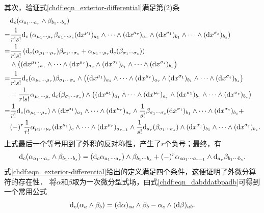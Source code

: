 其次，验证式\eqref{chdf:eqn_exterior-differential}满足第(2)条
\begin{align*}
    & {\rm d}_{c}(\alpha_{a_1\cdots a_r} \wedge \beta_{b_1\cdots b_s}) \\
   =& \frac{1}{r! s!} {\rm d}_{c}\left(\alpha_{\mu_{1}\cdots \mu_{r}} \beta_{\sigma_1\cdots \sigma_s}
      ({\rm d}x^{\mu_1})_{a_{1}} \wedge\cdots\wedge ({\rm d}x^{\mu_r})_{a_{r}}  \wedge
      ({\rm d}x^{\sigma_1})_{b_{1}} \wedge\cdots\wedge ({\rm d}x^{\sigma_s})_{b_{s}}  \right) \\
   =& \frac{1}{r! s!} \left( {\rm d}_{c}(\alpha_{\mu_{1}\cdots \mu_{r}}) \beta_{\sigma_1\cdots \sigma_s}
     +\alpha_{\mu_{1}\cdots \mu_{r}} {\rm d}_{c}(\beta_{\sigma_1\cdots \sigma_s})\right) \\
      &\wedge \bigl( ({\rm d}x^{\mu_1})_{a_{1}} \wedge\cdots\wedge ({\rm d}x^{\mu_r})_{a_{r}}  \wedge
      ({\rm d}x^{\sigma_1})_{b_{1}} \wedge\cdots\wedge ({\rm d}x^{\sigma_s})_{b_{s}}  \bigr) \\
   =& \frac{1}{r! s!}  {\rm d}_{c}(\alpha_{\mu_{1}\cdots \mu_{r}}) \beta_{\sigma_1\cdots \sigma_s}
      \wedge \bigl( ({\rm d}x^{\mu_1})_{a_{1}} \wedge\cdots\wedge ({\rm d}x^{\mu_r})_{a_{r}}  \wedge
      ({\rm d}x^{\sigma_1})_{b_{1}} \wedge\cdots\wedge ({\rm d}x^{\sigma_s})_{b_{s}}  \bigr) \\
     &+ \frac{1}{r! s!} \alpha_{\mu_{1}\cdots \mu_{r}} {\rm d}_{c}(\beta_{\sigma_1\cdots \sigma_s})
      \wedge \bigl( ({\rm d}x^{\mu_1})_{a_{1}} \wedge\cdots\wedge ({\rm d}x^{\mu_r})_{a_{r}}  \wedge
      ({\rm d}x^{\sigma_1})_{b_{1}} \wedge\cdots\wedge ({\rm d}x^{\sigma_s})_{b_{s}}  \bigr) \\
    =& \frac{1}{r!}  {\rm d}_{c}(\alpha_{\mu_{1}\cdots \mu_{r}})
      \wedge  ({\rm d}x^{\mu_1})_{a_{1}} \wedge\cdots\wedge ({\rm d}x^{\mu_r})_{a_{r}}  \wedge
      \frac{1}{s!} \beta_{\sigma_1\cdots \sigma_s}
      ({\rm d}x^{\sigma_1})_{b_{1}} \wedge\cdots\wedge ({\rm d}x^{\sigma_s})_{b_{s}}  + \\
      & (-)^r \frac{1}{r!} \alpha_{\mu_{1}\cdots \mu_{r}}
       ({\rm d}x^{\mu_1})_{c} \wedge\cdots\wedge ({\rm d}x^{\mu_r})_{a_{r-1}}  \wedge
      \frac{1}{s!} {\rm d}_{a_r}(\beta_{\sigma_1\cdots \sigma_s})\wedge
      ({\rm d}x^{\sigma_1})_{b_{1}} \wedge\cdots\wedge ({\rm d}x^{\sigma_s})_{b_{s}}.
\end{align*}
上式最后一个等号用到了外积的反对称性，产生了$r$个负号；最终，有
\begin{equation}\label{chdf:eqn_dabddatbpadb}
    {\rm d}_{c}(\alpha_{a_1\cdots a_r} \wedge \beta_{b_1\cdots b_s}) =
    ( {\rm d}_{c}\alpha_{a_1\cdots a_r}) \wedge \beta_{b_1\cdots b_s} + (-)^r
    \alpha_{ca_1\cdots a_{r-1}} \wedge {\rm d}_{a_r}\beta_{b_1\cdots b_s} .
\end{equation}
式\eqref{chdf:eqn_exterior-differential}给出的定义满足四个条件，这便证明了外微分算符的存在性．
将$\alpha$和$\beta$取为一次微分型式场，由式\eqref{chdf:eqn_dabddatbpadb}可得到一个常用公式
\begin{equation}\label{chdf:eqn_dwm}
    {\rm d}_c (\alpha_a \wedge \beta_b) =  ({\rm d}\alpha)_{ca} \wedge \beta_b
    - \alpha_c \wedge ({\rm d}\beta)_{ab} .
\end{equation}


